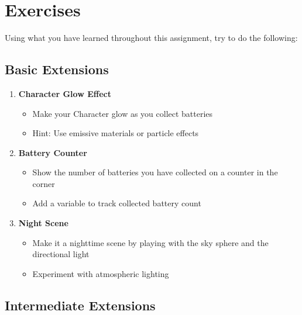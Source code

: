 \documentclass[
  letterpaper,
  DIV=11,
  numbers=noendperiod]{scrartcl}
\providecommand{\tightlist}{%
  \setlength{\itemsep}{0pt}\setlength{\parskip}{0pt}}
\begin{document}
\section{Exercises}\label{exercises}

Using what you have learned throughout this assignment, try to do the
following:

\subsection{Basic Extensions}\label{basic-extensions}

\begin{enumerate}
\def\labelenumi{\arabic{enumi}.}
\tightlist
\item
  \textbf{Character Glow Effect}

  \begin{itemize}
  \tightlist
  \item
    Make your Character glow as you collect batteries
  \item
    Hint: Use emissive materials or particle effects
  \end{itemize}
\item
  \textbf{Battery Counter}

  \begin{itemize}
  \tightlist
  \item
    Show the number of batteries you have collected on a counter in the
    corner
  \item
    Add a variable to track collected battery count
  \end{itemize}
\item
  \textbf{Night Scene}

  \begin{itemize}
  \tightlist
  \item
    Make it a nighttime scene by playing with the sky sphere and the
    directional light
  \item
    Experiment with atmospheric lighting
  \end{itemize}
\end{enumerate}

\subsection{Intermediate Extensions}\label{intermediate-extensions}
\end{document}
